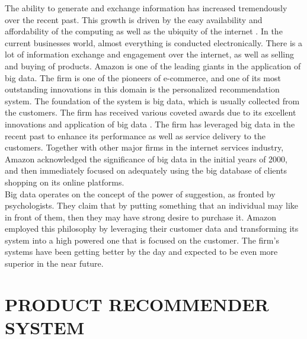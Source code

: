 \documentclass[sigconf]{acmart}
\begin{document}
The ability to generate and exchange information has increased tremendously over the recent past. This growth is driven by the easy availability and affordability of the computing as well as the 
ubiquity of the internet \cite{BergerandDoban2014}. In the current businesses world, almost everything is conducted electronically. There is a lot of information exchange and engagement over the 
internet, as well as selling and buying of products. Amazon is one of the leading giants in the application of big data. The firm is one of the pioneers of e-commerce, and one of its most outstanding 
innovations in this domain is the personalized recommendation system. The foundation of the system is big data, which is usually collected from the customers.  The firm has received various coveted 
awards due to its excellent innovations and application of big data \cite{BergerandDoban2014}. The firm has leveraged big data in the recent past to enhance its performance as well as service delivery 
to the customers. Together with other major firms in the internet services industry, Amazon acknowledged the significance of big data in the initial years of 2000, and then immediately focused on 
adequately using the big database of clients shopping on its online platforms. \\
Big data operates on the concept of the power of suggestion, as fronted by psychologists. They claim that by putting something that an individual may like in front of them, then they may have strong 
desire to purchase it. Amazon employed this philosophy by leveraging their customer data and transforming its system into a high powered one that is focused on the customer. The firm’s systems have 
been getting better by the day and expected to be even more superior in the near future.

\section{PRODUCT RECOMMENDER SYSTEM}
\end{document}
